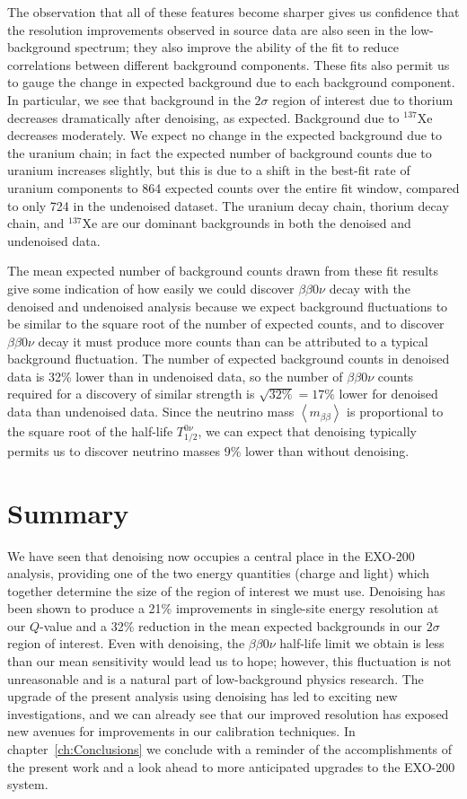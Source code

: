 The observation that all of these features become sharper gives us confidence that the resolution improvements observed in source data are also seen in the low-background spectrum; they also improve the ability of the fit to reduce correlations between different background components.  These fits also permit us to gauge the change in expected background due to each background component.  In particular, we see that background in the $2\sigma$ region of interest due to thorium decreases dramatically after denoising, as expected.  Background due to $^{137}$Xe decreases moderately.  We expect no change in the expected background due to the uranium chain; in fact the expected number of background counts due to uranium increases slightly, but this is due to a shift in the best-fit rate of uranium components to 864 expected counts over the entire fit window, compared to only 724 in the undenoised dataset.  The uranium decay chain, thorium decay chain, and $^{137}$Xe are our dominant backgrounds in both the denoised and undenoised data.

The mean expected number of background counts drawn from these fit results give some indication of how easily we could discover $\beta\beta 0\nu$ decay with the denoised and undenoised analysis because we expect background fluctuations to be similar to the square root of the number of expected counts, and to discover $\beta\beta 0\nu$ decay it must produce more counts than can be attributed to a typical background fluctuation.  The number of expected background counts in denoised data is 32\% lower than in undenoised data, so the number of $\beta\beta 0\nu$ counts required for a discovery of similar strength is $\sqrt{32\%} = 17\%$ lower for denoised data than undenoised data.  Since the neutrino mass $\left<m_{\beta\beta}\right>$ is proportional to the square root of the half-life $T_{1/2}^{0\nu}$, we can expect that denoising typically permits us to discover neutrino masses 9\% lower than without denoising.

\section{Summary}\label{sec:ResultSummary}

We have seen that denoising now occupies a central place in the EXO-200 analysis, providing one of the two energy quantities (charge and light) which together determine the size of the region of interest we must use.  Denoising has been shown to produce a 21\% improvements in single-site energy resolution at our $Q$-value and a 32\% reduction in the mean expected backgrounds in our $2\sigma$ region of interest.  Even with denoising, the $\beta\beta 0\nu$ half-life limit we obtain is less than our mean sensitivity would lead us to hope; however, this fluctuation is not unreasonable and is a natural part of low-background physics research.  The upgrade of the present analysis using denoising has led to exciting new investigations, and we can already see that our improved resolution has exposed new avenues for improvements in our calibration techniques.  In chapter~\ref{ch:Conclusions} we conclude with a reminder of the accomplishments of the present work and a look ahead to more anticipated upgrades to the EXO-200 system.
